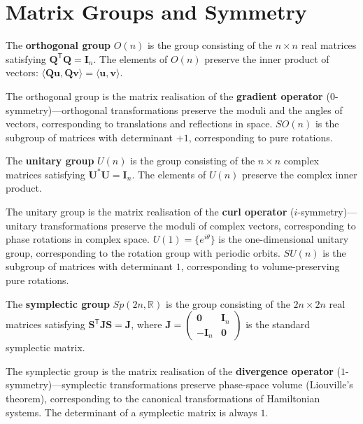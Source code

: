 \section{\texorpdfstring{Matrix Groups and Symmetry}{Matrix Groups and Symmetry}}

\begin{definition}\label{def:orthogonal_group}
The \textbf{orthogonal group} $O(n)$ is the group consisting of the $n \times n$ real matrices satisfying $\mathbf{Q}^{\mathsf T} \mathbf{Q} = \mathbf{I}_n$. The elements of $O(n)$ preserve the inner product of vectors: $\langle \mathbf{Q}\mathbf{u}, \mathbf{Q}\mathbf{v} \rangle = \langle \mathbf{u}, \mathbf{v} \rangle$.

The orthogonal group is the matrix realisation of the \textbf{gradient operator} ($0$-symmetry)---orthogonal transformations preserve the moduli and the angles of vectors, corresponding to translations and reflections in space. $SO(n)$ is the subgroup of matrices with determinant $+1$, corresponding to pure rotations.
\end{definition}

\begin{definition}\label{def:unitary_group}
The \textbf{unitary group} $U(n)$ is the group consisting of the $n \times n$ complex matrices satisfying $\mathbf{U}^* \mathbf{U} = \mathbf{I}_n$. The elements of $U(n)$ preserve the complex inner product.

The unitary group is the matrix realisation of the \textbf{curl operator} ($i$-symmetry)---unitary transformations preserve the moduli of complex vectors, corresponding to phase rotations in complex space. $U(1) = \{e^{i\theta}\}$ is the one-dimensional unitary group, corresponding to the rotation group with periodic orbits. $SU(n)$ is the subgroup of matrices with determinant $1$, corresponding to volume-preserving pure rotations.
\end{definition}

\begin{definition}\label{def:symplectic_group}
The \textbf{symplectic group} $Sp(2n, \mathbb{R})$ is the group consisting of the $2n \times 2n$ real matrices satisfying $\mathbf{S}^{\mathsf T} \mathbf{J} \mathbf{S} = \mathbf{J}$, where $\mathbf{J} = \begin{pmatrix} \mathbf{0} & \mathbf{I}_n \\ -\mathbf{I}_n & \mathbf{0} \end{pmatrix}$ is the standard symplectic matrix.

The symplectic group is the matrix realisation of the \textbf{divergence operator} ($1$-symmetry)---symplectic transformations preserve phase-space volume (Liouville's theorem), corresponding to the canonical transformations of Hamiltonian systems. The determinant of a symplectic matrix is always $1$.
\end{definition}

